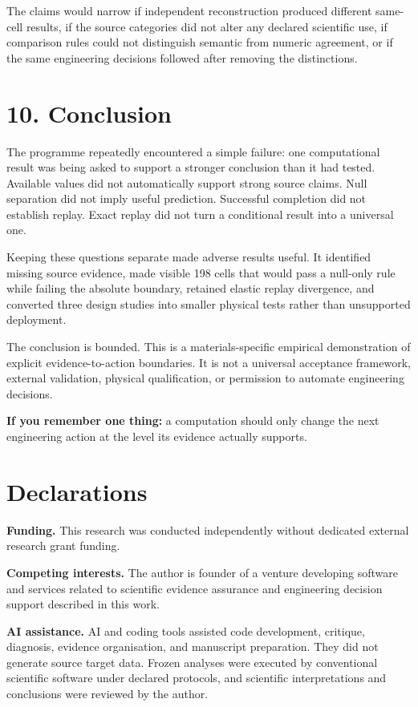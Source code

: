 \documentclass[10pt,a4paper]{article}
\begin{document}
The claims would narrow if independent reconstruction produced different same-cell results, if the source categories did not alter any declared scientific use, if comparison rules could not distinguish semantic from numeric agreement, or if the same engineering decisions followed after removing the distinctions.

\section{10. Conclusion}
The programme repeatedly encountered a simple failure: one computational result was being asked to support a stronger conclusion than it had tested. Available values did not automatically support strong source claims. Null separation did not imply useful prediction. Successful completion did not establish replay. Exact replay did not turn a conditional result into a universal one.

Keeping these questions separate made adverse results useful. It identified missing source evidence, made visible 198 cells that would pass a null-only rule while failing the absolute boundary, retained elastic replay divergence, and converted three design studies into smaller physical tests rather than unsupported deployment.

The conclusion is bounded. This is a materials-specific empirical demonstration of explicit evidence-to-action boundaries. It is not a universal acceptance framework, external validation, physical qualification, or permission to automate engineering decisions.

\textbf{If you remember one thing:} a computation should only change the next engineering action at the level its evidence actually supports.

\section*{Declarations}
\textbf{Funding.} This research was conducted independently without dedicated external research grant funding.

\textbf{Competing interests.} The author is founder of a venture developing software and services related to scientific evidence assurance and engineering decision support described in this work.

\textbf{AI assistance.} AI and coding tools assisted code development, critique, diagnosis, evidence organisation, and manuscript preparation. They did not generate source target data. Frozen analyses were executed by conventional scientific software under declared protocols, and scientific interpretations and conclusions were reviewed by the author.
\end{document}
